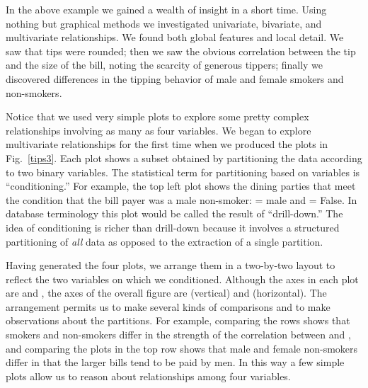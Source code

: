 \vspace{1em}

In the above example we gained a wealth of insight in a short time.
Using nothing but graphical methods we investigated univariate,
bivariate, and multivariate relationships.  We found both global
features and local detail.  We saw that tips were rounded; then we saw
the obvious correlation between the tip and the size of the bill,
noting the scarcity of generous tippers; finally we discovered
differences in the tipping behavior of male and female smokers and
non-smokers.


Notice that we used very simple plots to explore some pretty complex
relationships involving as many as four variables.  We began to
explore multivariate relationships for the first time when we produced
the plots in Fig.~\ref{tips3}. Each plot shows a subset obtained by
partitioning the data according to two binary variables.  The
statistical term for partitioning based on variables is
``conditioning.''  For example, the top left plot shows the dining
parties that meet the condition that the bill payer was a male
non-smoker:  = male and  = False.  In database
terminology this plot would be called the result of ``drill-down.''
The idea of conditioning is richer than drill-down because it involves
a structured partitioning of {\em all} data as opposed to the
extraction of a single partition.

Having generated the four plots, we arrange them in a two-by-two
layout to reflect the two variables on which we conditioned.  Although
the axes in each plot are  and , the
axes of the overall figure are  (vertical) and 
(horizontal).  The arrangement permits us to make several kinds of
comparisons and to make observations about the partitions.  For example,
comparing the rows shows that smokers and non-smokers differ in the
strength of the correlation between  and , and
comparing the plots in the top row shows that male and female
non-smokers differ in that the larger bills tend to be paid by men.
In this way a few simple plots allow us to reason about relationships
among four variables.

